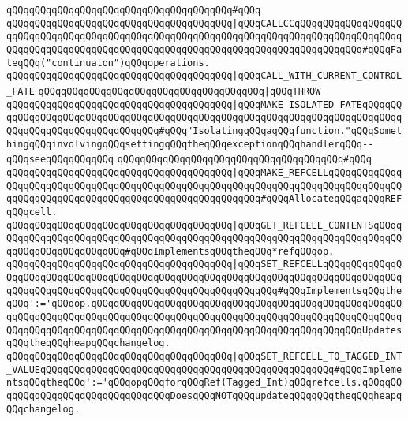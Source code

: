 \verb|qQQqqQQqqQQqqQQqqQQqqQQqqQQqqQQqqQQqqQQq#qQQq|\newline
\verb|qQQqqQQqqQQqqQQqqQQqqQQqqQQqqQQqqQQqqQQq|\verb#|qQQqCALLCCqQQqqQQqqQQqqQQqqQQqqQQqqQQqqQQqqQQqqQQqqQQqqQQqqQQqqQQqqQQqqQQqqQQqqQQqqQQqqQQqqQQqqQQqqQQqqQQqqQQqqQQqqQQqqQQqqQQqqQQqqQQqqQQqqQQqqQQqqQQqqQQqqQQqqQQq#\verb|#qQQqFateqQQq("continuaton")qQQqoperations.|\newline
\verb|qQQqqQQqqQQqqQQqqQQqqQQqqQQqqQQqqQQqqQQq|\verb#|qQQqCALL_WITH_CURRENT_CONTROL_FATE#\newline
\verb|qQQqqQQqqQQqqQQqqQQqqQQqqQQqqQQqqQQqqQQq|\verb#|qQQqTHROW#\newline
\verb|qQQqqQQqqQQqqQQqqQQqqQQqqQQqqQQqqQQqqQQq|\verb#|qQQqMAKE_ISOLATED_FATEqQQqqQQqqQQqqQQqqQQqqQQqqQQqqQQqqQQqqQQqqQQqqQQqqQQqqQQqqQQqqQQqqQQqqQQqqQQqqQQqqQQqqQQqqQQqqQQqqQQqqQQq#\verb|#qQQq"IsolatingqQQqaqQQqfunction."qQQqSomethingqQQqinvolvingqQQqsettingqQQqtheqQQqexceptionqQQqhandlerqQQq--qQQqseeqQQqqQQqqQQq|\newline
\verb|qQQqqQQqqQQqqQQqqQQqqQQqqQQqqQQqqQQqqQQq#qQQq|\newline
\verb|qQQqqQQqqQQqqQQqqQQqqQQqqQQqqQQqqQQqqQQq|\verb#|qQQqMAKE_REFCELLqQQqqQQqqQQqqQQqqQQqqQQqqQQqqQQqqQQqqQQqqQQqqQQqqQQqqQQqqQQqqQQqqQQqqQQqqQQqqQQqqQQqqQQqqQQqqQQqqQQqqQQqqQQqqQQqqQQqqQQqqQQqqQQq#\verb|#qQQqAllocateqQQqaqQQqREFqQQqcell.|\newline
\verb|qQQqqQQqqQQqqQQqqQQqqQQqqQQqqQQqqQQqqQQq|\verb#|qQQqGET_REFCELL_CONTENTSqQQqqQQqqQQqqQQqqQQqqQQqqQQqqQQqqQQqqQQqqQQqqQQqqQQqqQQqqQQqqQQqqQQqqQQqqQQqqQQqqQQqqQQqqQQqqQQq#\verb|#qQQqImplementsqQQqtheqQQq*refqQQqop.|\newline
\verb|qQQqqQQqqQQqqQQqqQQqqQQqqQQqqQQqqQQqqQQq|\verb#|qQQqSET_REFCELLqQQqqQQqqQQqqQQqqQQqqQQqqQQqqQQqqQQqqQQqqQQqqQQqqQQqqQQqqQQqqQQqqQQqqQQqqQQqqQQqqQQqqQQqqQQqqQQqqQQqqQQqqQQqqQQqqQQqqQQqqQQqqQQqqQQq#\verb|#qQQqImplementsqQQqtheqQQq':='qQQqop.qQQqqQQqqQQqqQQqqQQqqQQqqQQqqQQqqQQqqQQqqQQqqQQqqQQqqQQqqQQqqQQqqQQqqQQqqQQqqQQqqQQqqQQqqQQqqQQqqQQqqQQqqQQqqQQqqQQqqQQqqQQqqQQqqQQqqQQqqQQqqQQqqQQqqQQqqQQqqQQqqQQqqQQqqQQqqQQqqQQqqQQqqQQqUpdatesqQQqtheqQQqheapqQQqchangelog.|\newline
\verb|qQQqqQQqqQQqqQQqqQQqqQQqqQQqqQQqqQQqqQQq|\verb#|qQQqSET_REFCELL_TO_TAGGED_INT_VALUEqQQqqQQqqQQqqQQqqQQqqQQqqQQqqQQqqQQqqQQqqQQqqQQqqQQq#\verb|#qQQqImplementsqQQqtheqQQq':='qQQqopqQQqforqQQqRef(Tagged_Int)qQQqrefcells.qQQqqQQqqQQqqQQqqQQqqQQqqQQqqQQqqQQqDoesqQQqNOTqQQqupdateqQQqqQQqtheqQQqheapqQQqchangelog.|\newline
